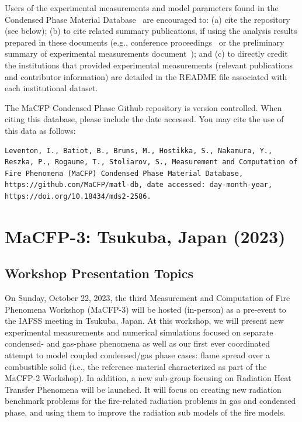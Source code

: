 \documentclass[12pt]{article}
\begin{document}
Users of the experimental measurements and model parameters found in the Condensed Phase Material Database~\cite{MaCFP-cond-db} are encouraged to: (a) cite the repository (see below); (b) to cite related summary publications, if using the analysis results prepared in these documents (e.g., conference proceedings~\cite{brown2018proceedings} or the preliminary summary of experimental measurements document~\cite{MaCFP-2_Prelim_Exp}); and (c) to directly credit the institutions that provided experimental measurements (relevant publications and contributor information) are detailed in the README file associated with each institutional dataset.

The MaCFP Condensed Phase Github repository is version controlled. When citing this database, please include the date accessed. You may cite the use of this data as follows:

\begin{lstlisting}
Leventon, I., Batiot, B., Bruns, M., Hostikka, S., Nakamura, Y., Reszka, P., Rogaume, T., Stoliarov, S., Measurement and Computation of Fire Phenomena (MaCFP) Condensed Phase Material Database, https://github.com/MaCFP/matl-db, date accessed: day-month-year, https://doi.org/10.18434/mds2-2586.
\end{lstlisting}

\clearpage
\section{MaCFP-3: Tsukuba, Japan (2023)}
\label{Sec:MaCFP-3}
\subsection{Workshop Presentation Topics}
\label{Sec:MaCFP-3 Target Cases}
On Sunday, October 22, 2023, the third Measurement and Computation of Fire Phenomena Workshop (MaCFP-3) will be hosted (in-person) as a pre-event to the IAFSS meeting in Tsukuba, Japan. At this workshop, we will present new experimental measurements and numerical simulations focused on separate condensed- and gas-phase phenomena as well as our first ever coordinated attempt to model coupled condensed/gas phase cases: flame spread over a combustible solid (i.e., the reference material characterized as part of the MaCFP-2 Workshop). In addition, a new sub-group focusing on Radiation Heat Transfer Phenomena will be launched. It will focus on creating new radiation benchmark problems for the fire-related radiation problems in gas and condensed phase, and using them to improve the radiation sub models of the fire models.
\end{document}
